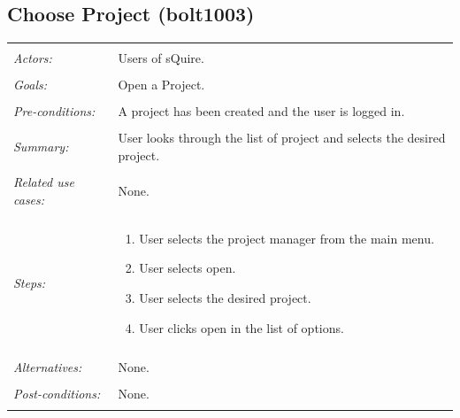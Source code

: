 \documentclass[11pt]{report}
\begin{document}
\subsection{Choose Project (bolt1003)}
\begin{tabular}{ p{2cm} p{12cm} }
 \hline
 \\
 \textit{Actors:} & Users of sQuire. \\ 
 \\
 \textit{Goals:} & Open a Project. \\
 \\
 \textit{Pre-conditions:} & A project has been created and the user is logged in. \\
 \\
 \textit{Summary:} & User looks through the list of project and selects the desired project. \\ 
 \\
 \textit{Related use cases:} & None. \\ 
 \\
 \textit{Steps:} & \begin{enumerate}
  \item User selects the project manager from the main menu.
  \item User selects open.
  \item User selects the desired project.
  \item User clicks open in the list of options.
 \end{enumerate} \\
 \\
 \textit{Alternatives:} & None. \\
 \\
 \textit{Post-conditions:} & None. \\
 \\
\hline
\end{tabular}
\end{document}
